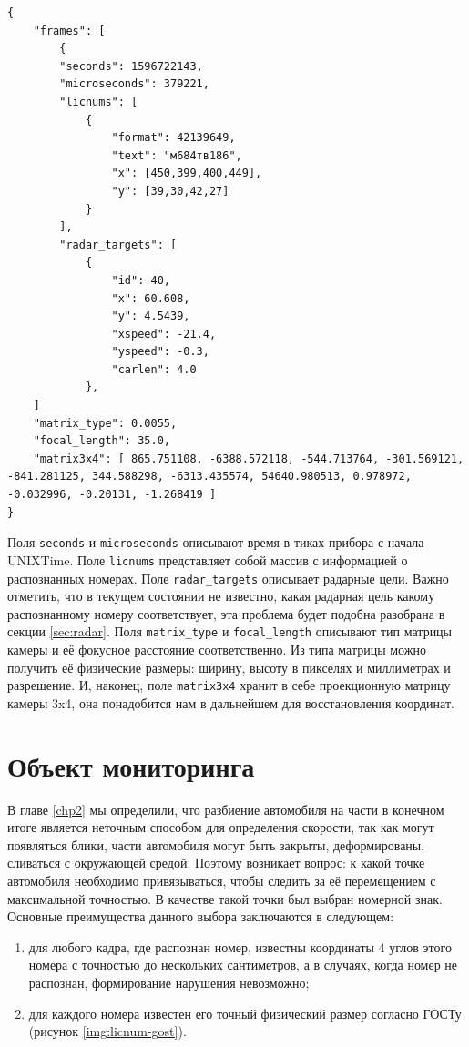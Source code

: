 \documentclass[specification,annotation,times]{itmo-student-thesis}
\begin{document}
\begin{lstlisting}[float=!h,caption={Пример JSON-файла.},label={lst:json}]
{
	"frames": [
		{
		"seconds": 1596722143,
		"microseconds": 379221,
		"licnums": [
			{
				"format": 42139649,
				"text": "м684тв186",
				"x": [450,399,400,449],
				"y": [39,30,42,27]
			}
		],
		"radar_targets": [
			{
				"id": 40,
				"x": 60.608,
				"y": 4.5439,
				"xspeed": -21.4,
				"yspeed": -0.3,
				"carlen": 4.0
			},
	]
	"matrix_type": 0.0055,
	"focal_length": 35.0,
	"matrix3x4": [ 865.751108, -6388.572118, -544.713764, -301.569121, -841.281125,	344.588298, -6313.435574, 54640.980513,	0.978972, -0.032996, -0.20131, -1.268419 ]
}
\end{lstlisting}

Поля \texttt{seconds} и \texttt{microseconds} описывают время в тиках прибора с начала UNIXTime. Поле \texttt{licnums} представляет собой массив с информацией о распознанных номерах. Поле \texttt{radar\_targets} описывает радарные цели. Важно отметить, что в текущем состоянии не известно, какая радарная цель какому распознанному номеру соответствует, эта проблема будет подобна разобрана в секции \ref{sec:radar}. Поля \texttt{matrix\_type} и \texttt{focal\_length} описывают тип матрицы камеры и её фокусное расстояние соответственно. Из типа матрицы можно получить её физические размеры: ширину, высоту в пикселях и миллиметрах и разрешение. И, наконец, поле \texttt{matrix3x4} хранит в себе проекционную матрицу камеры 3x4, она понадобится нам в дальнейшем для восстановления координат.

\section{Объект мониторинга} \label{sec:monitor}
В главе \ref{chp2} мы определили, что разбиение автомобиля на части в конечном итоге является неточным способом для определения скорости, так как могут появляться блики, части автомобиля могут быть закрыты, деформированы, сливаться с окружающей средой. Поэтому возникает вопрос: к какой точке автомобиля необходимо привязываться, чтобы следить за её перемещением с максимальной точностью. В качестве такой точки был выбран номерной знак. Основные преимущества данного выбора заключаются в следующем:

\begin{enumerate}
	\item для любого кадра, где распознан номер, известны координаты 4 углов этого номера с точностью до нескольких сантиметров, а в случаях, когда номер не распознан, формирование нарушения невозможно;
	\item для каждого номера известен его точный физический размер согласно ГОСТу (рисунок \ref{img:licnum-gost}).
\end{enumerate}
\end{document}
